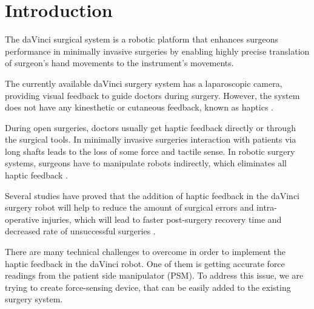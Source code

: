 \chapter{Introduction}
\label{intro} %


The daVinci surgical system is a robotic platform that enhances surgeons performance in minimally invasive surgeries by enabling highly precise translation of surgeon's hand movements to the instrument's movements. 

The currently available daVinci surgery system 
has a laparoscopic camera, providing visual feedback to guide doctors during surgery. However, the system does not have any kinesthetic or cutaneous feedback, known as haptics \cite{_intuitive_2018}.


During open surgeries, doctors usually get haptic feedback directly or through the surgical tools. In minimally invasive surgeries interaction with patients via long shafts leads to the loss of some force and tactile sense. In robotic surgery systems, surgeons have to manipulate robots indirectly, which eliminates all haptic feedback \cite{okamura_haptic_2009}.

Several studies \cite{wagner_benefit_2007, yiasemidou_faster_2011, currie_role_2017} have proved that the addition of haptic feedback in the daVinci surgery robot will help to reduce the amount of surgical errors and intra-operative injuries, which will lead to faster post-surgery recovery time and decreased rate of unsuccessful surgeries \cite{reiley_effects_2008, meijden_value_2009, okamura_haptic_2009}.

There are many technical challenges to overcome in order to implement the haptic feedback in the daVinci robot. One of them is getting accurate force readings from the patient side manipulator (PSM). To address this issue, we are trying to create force-sensing device, that can be easily added to the existing surgery system.